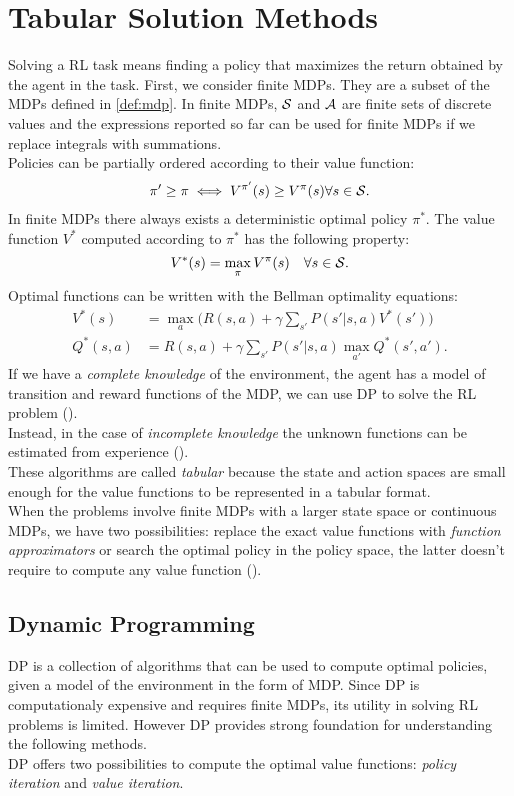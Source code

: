 \section{Tabular Solution Methods}\label{sec:tabmet}
Solving a \ac{RL} task means finding a policy that maximizes the return obtained by the agent in the task. First, we consider finite \ac{MDPs}. They are a subset of the \ac{MDPs} defined in \ref{def:mdp}. In finite \ac{MDPs}, $\mathcal{S}$ and $\mathcal{A}$ are finite sets of discrete values and the expressions reported so far can be used for finite \ac{MDPs} if we replace integrals with summations.\\
Policies can be partially ordered according to their value function: 
\begin{align}
\pi' \geq \pi \iff V^{\pi'}(s) \geq V^{\pi}(s) \forall s \in \mathcal{S}. \label{eq:ordpol}
\end{align} 
In finite \ac{MDPs} there always exists a deterministic optimal policy $\pi^{*}$. The value function $V^{*}$ computed according to $\pi^{*}$ has the following property:
$$ V^{*}(s) = \max_{\pi}V^{\pi}(s) \quad \forall s \in \mathcal{S}.$$
Optimal functions can be written with the Bellman optimality equations:
\begin{align*}
V^{*}(s) &= \max_a \Big( R(s,a) + \gamma \sum_{s'}P(s'|s,a)   V^{*}(s') \Big)\\
Q^{*}(s,a) &= R(s,a) + \gamma \sum_{s'}P(s'|s,a) \max_{a'} Q^{*}(s', a').
\end{align*}
If we have a \emph{complete knowledge} of the environment, \ie the agent has a model of transition and reward functions of the \ac{MDP}, we can use \acf{DP} to solve the \ac{RL} problem ().\\
Instead, in the case of \emph{incomplete knowledge} the unknown functions can be estimated from experience ().\\
These algorithms are called \emph{tabular} because the state and action spaces are small enough for the value functions to be represented in a tabular format.\\
\newline
When the problems involve finite \ac{MDPs} with a larger state space or continuous \ac{MDPs}, we have two possibilities: replace the exact value functions with \emph{function approximators} or search the optimal policy in the policy space, the latter doesn't require to compute any value function ().

\subsection{Dynamic Programming}\label{subsec:dp}
\acf{DP} is a collection of algorithms that can be used to compute optimal policies, given a model of the environment in the form of \ac{MDP}. Since \ac{DP} is computationaly expensive and requires finite \ac{MDP}s, its utility in solving \ac{RL} problems is limited. However \ac{DP} provides strong foundation for understanding the following methods.\\
\newline
\ac{DP} offers two possibilities to compute the optimal value functions: \emph{policy iteration} and \emph{value iteration}.

